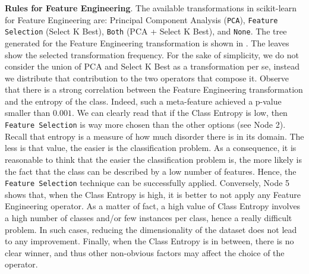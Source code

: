 \begin{example}
\textbf{Rules for Feature Engineering}. The available transformations in scikit-learn for Feature Engineering are: Principal Component Analysis (\texttt{PCA}), \texttt{Feature Selection} (Select K Best), \texttt{Both} (PCA + Select K Best), and \texttt{None}.
The tree generated for the Feature Engineering transformation is shown in .
The leaves show the selected transformation frequency.
For the sake of simplicity, we do not consider the union of PCA and Select K Best as a transformation per se, instead we distribute that contribution to the two operators that compose it.
Observe that there is a strong correlation between the Feature Engineering transformation and the entropy of the class.
Indeed, such a meta-feature achieved a p-value smaller than $0.001$.
We can clearly read that if the Class Entropy is low, then \texttt{Feature Selection} is way more chosen than the other options (see Node 2).
Recall that entropy is a measure of how much disorder there is in its domain.
The less is that value, the easier is the classification problem.
As a consequence, it is reasonable to think that the easier the classification problem is, the more likely is the fact that the class can be described by a low number of features.
Hence, the \texttt{Feature Selection} technique can be successfully applied.
Conversely, Node 5 shows that, when the Class Entropy is high, it is better to not apply any Feature Engineering operator.
As a matter of fact, a high value of Class Entropy involves a high number of classes and/or few instances per class, hence a really difficult problem.
In such cases, reducing the dimensionality of the dataset does not lead to any improvement.
Finally, when the Class Entropy is in between, there is no clear winner, and thus other non-obvious factors may affect the choice of the operator.


\end{example}
